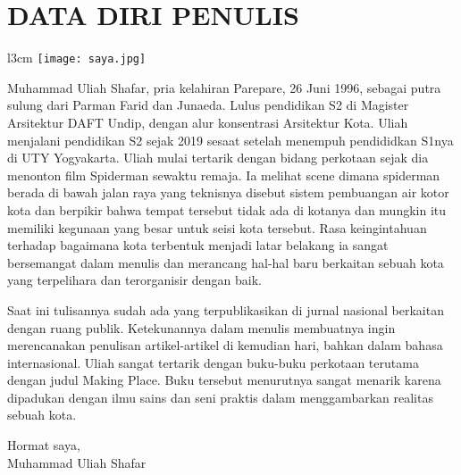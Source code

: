 \documentclass[../projects/thesis.tex]{subfiles}
\begin{document}
\chapter*{DATA DIRI PENULIS}

\begin{wrapfigure}[7]{l}{3cm}
\centering
    \texttt{[image: saya.jpg]}
\end{wrapfigure}

\noindent Muhammad Uliah Shafar, pria kelahiran Parepare, 26 Juni 1996, sebagai putra sulung dari Parman Farid dan Junaeda. Lulus pendidikan S2 di Magister Arsitektur DAFT Undip, dengan alur konsentrasi Arsitektur Kota. Uliah menjalani pendidikan S2 sejak 2019 sesaat setelah menempuh pendididkan S1nya di UTY Yogyakarta.
Uliah mulai tertarik dengan bidang perkotaan sejak dia menonton film Spiderman sewaktu remaja. Ia melihat scene dimana spiderman berada di bawah jalan raya yang teknisnya disebut sistem pembuangan air kotor kota dan berpikir bahwa tempat tersebut tidak ada di kotanya dan mungkin itu memiliki kegunaan yang besar untuk seisi kota tersebut. Rasa keingintahuan terhadap bagaimana kota terbentuk menjadi latar belakang ia sangat bersemangat dalam menulis dan merancang hal-hal baru berkaitan sebuah kota yang terpelihara dan terorganisir dengan baik.

Saat ini tulisannya sudah ada yang terpublikasikan di jurnal nasional berkaitan dengan ruang publik. Ketekunannya dalam menulis membuatnya ingin merencanakan penulisan artikel-artikel di kemudian hari, bahkan dalam bahasa internasional. Uliah sangat tertarik dengan buku-buku perkotaan terutama dengan judul Making Place. Buku tersebut menurutnya sangat menarik karena dipadukan dengan ilmu sains dan seni praktis dalam menggambarkan realitas sebuah kota.

\vspace{2\baselineskip}
\begin{flushright}
    Hormat saya,\\ Muhammad Uliah Shafar
\end{flushright}


\end{document}
